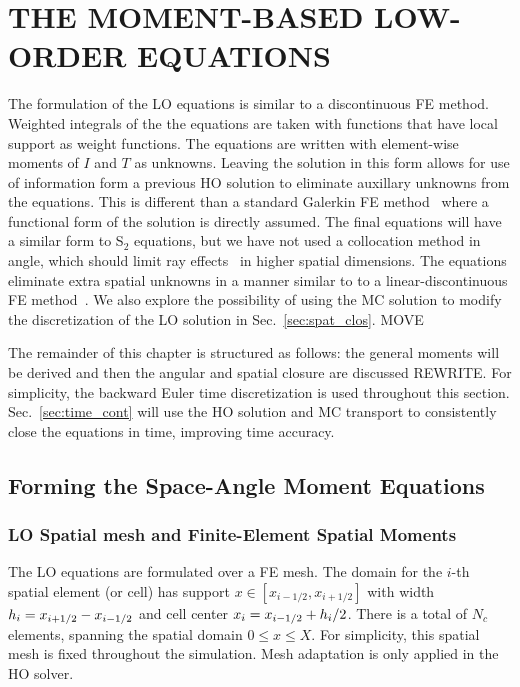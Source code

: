 
\chapter{\uppercase{The Moment-Based Low-Order Equations}}

The formulation of the LO equations is similar to a discontinuous FE method.  Weighted
integrals of the the equations are taken with functions that have local support as weight
functions.  The equations are written with element-wise moments of $I$ and $T$ as
unknowns.  Leaving the solution in this form allows for use of information form a
previous HO solution to eliminate auxillary unknowns from the equations. This is different than a standard Galerkin FE
method~\cite{fe_book} where a
functional form of the solution is directly assumed. The final equations will have a
similar form to S$_2$ equations, but we have not used a collocation method in angle,
which should limit ray effects~\cite{ray_effects} in higher spatial dimensions.
The equations eliminate extra spatial unknowns in a manner similar to to a linear-discontinuous FE
method~\cite{morel_ldtrt}.  We also explore the
possibility of using the MC solution to modify the discretization of the LO solution in
Sec.~\ref{sec:spat_clos}.   MOVE


The remainder of this chapter is structured as follows: the general moments will be
derived and then the angular and spatial closure are discussed REWRITE.  For
simplicity, the backward Euler time discretization is used throughout this section.
Sec.~\ref{sec:time_cont} will use the HO solution and MC transport to consistently
close the equations in time, improving time accuracy.

\section{Forming the Space-Angle Moment Equations}

\subsection{LO Spatial mesh and Finite-Element Spatial Moments}

The LO equations are formulated over a FE mesh.  The domain for the $i$-th spatial
element (or cell) has support $x\in[x_{i-1/2},x_{i+1/2}]$ with width $h_i=x_{i+1/2} -
x_{{i-1/2}}$ and cell center 
$x_i = x_{{i-1/2}} + h_i/2$.  There is a total of $N_c$ elements, spanning the
spatial domain $0\leq x\leq X$.  For simplicity, this spatial mesh is fixed throughout the
simulation.  Mesh adaptation is only applied in the HO solver.

